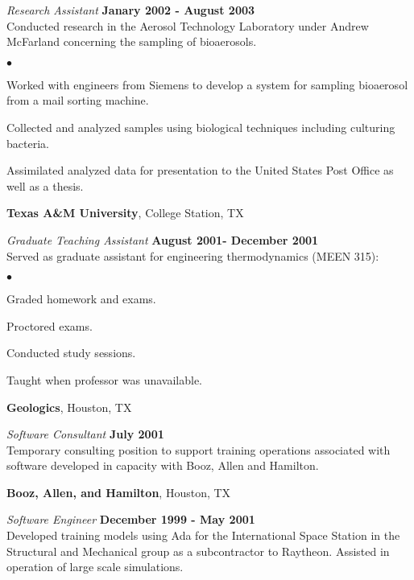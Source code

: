 \documentclass[margin,line]{res}
\newenvironment{list2}{
  \begin{list}{$\bullet$}{%
      \setlength{\itemsep}{0in}
      \setlength{\parsep}{0in} \setlength{\parskip}{0in}
      \setlength{\topsep}{0in} \setlength{\partopsep}{0in} 
      \setlength{\leftmargin}{0.2in}}}{\end{list}}
\begin{document}
\begin{resume}
\vspace{-.3cm}
{\em Research Assistant} \hfill {\bf Janary 2002 - August 2003}\\
Conducted research in the Aerosol Technology Laboratory under Andrew McFarland concerning the sampling of bioaerosols.
\vspace*{.05in} 
\begin{list2}
\item Worked with engineers from Siemens to develop a system for sampling bioaerosol from a mail sorting machine.
\item Collected and analyzed samples using biological techniques including culturing bacteria.
\item Assimilated analyzed data for presentation to the United States Post Office as well as a thesis.
\end{list2} 


{\bf Texas A\&M University}, College Station, TX

\vspace{-.3cm}
{\em Graduate Teaching Assistant} \hfill {\bf August 2001- December 2001}\\
Served as graduate assistant for engineering thermodynamics (MEEN 315):
\vspace*{.05in} 
\begin{list2}
\item Graded homework and exams.
\item Proctored exams.
\item Conducted study sessions.
\item Taught when professor was unavailable.
\end{list2}


{\bf Geologics}, Houston, TX

\vspace{-.3cm}
{\em Software Consultant} \hfill {\bf July 2001}\\
Temporary consulting position to support training operations associated with software developed in capacity with Booz, Allen and Hamilton.


{\bf Booz, Allen, and Hamilton}, Houston, TX

\vspace{-.3cm}
{\em Software Engineer} \hfill {\bf December 1999 - May 2001}\\
Developed training models using Ada for the International Space Station in the Structural and Mechanical group as a subcontractor to Raytheon.  Assisted in operation of large scale simulations.


\end{resume}
\end{document}
